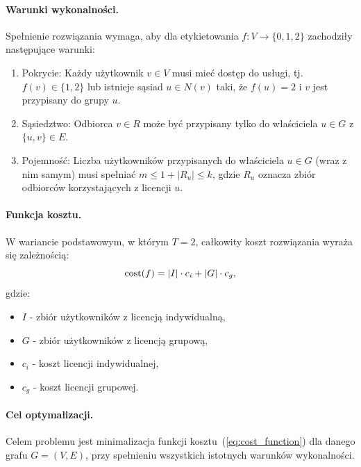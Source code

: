 \paragraph{Warunki wykonalności.}
Spełnienie rozwiązania wymaga, aby dla etykietowania $f:V\to\{0,1,2\}$ zachodziły następujące warunki:
\begin{enumerate}
  \item Pokrycie: Każdy użytkownik $v \in V$ musi mieć dostęp do usługi, tj. $f(v)\in\{1,2\}$ lub istnieje sąsiad $u\in N(v)$ taki, że $f(u)=2$ i $v$ jest przypisany do grupy $u$.
  \item Sąsiedztwo: Odbiorca $v\in R$ może być przypisany tylko do właściciela $u\in G$ z $\{u,v\}\in E$.
  \item Pojemność: Liczba użytkowników przypisanych do właściciela $u\in G$ (wraz z nim samym) musi spełniać $m \le 1+|R_u| \le k$, gdzie $R_u$ oznacza zbiór odbiorców korzystających z licencji $u$.
\end{enumerate}


\paragraph{Funkcja kosztu.}
W wariancie podstawowym, w którym $T=2$, całkowity koszt rozwiązania wyraża się zależnością:
\begin{equation}
  \operatorname{cost}(f) = |I|\cdot c_i + |G|\cdot c_g ,
  \label{eq:cost_function}
\end{equation}
gdzie:
\begin{itemize}
  \item $I$ - zbiór użytkowników z licencją indywidualną,
  \item $G$ - zbiór użytkowników z licencją grupową,
  \item $c_i$ - koszt licencji indywidualnej,
  \item $c_g$ - koszt licencji grupowej.
\end{itemize}

\paragraph{Cel optymalizacji.}
Celem problemu jest minimalizacja funkcji kosztu~(\ref{eq:cost_function}) dla danego grafu $G=(V,E)$, przy spełnieniu wszystkich istotnych warunków wykonalności.



